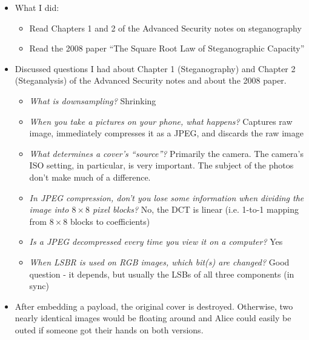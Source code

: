 \documentclass[11pt,a4paper]{report}
\begin{document}
\begin{itemize}

\item What I did:
  \begin{itemize}
  \item Read Chapters 1 and 2 of the Advanced Security notes on steganography
  \item Read the 2008 paper ``The Square Root Law of Steganographic Capacity''
  \end{itemize}

\item Discussed questions I had about Chapter 1 (Steganography) and Chapter 2 (Steganalysis) of the Advanced Security notes and about the 2008 paper.
  \begin{itemize}

  \item \textit{What is downsampling?} Shrinking

  \item \textit{When you take a pictures on your phone, what happens?} Captures raw image, immediately compresses it as a JPEG, and discards the raw image

  \item \textit{What determines a cover's ``source''?} Primarily the camera. The camera's ISO setting, in particular, is very important. The subject of the photos don't make much of a difference.

  \item \textit{In JPEG compression, don't you lose some information when dividing the image into $8\times8$ pixel blocks?} No, the DCT is linear (i.e. 1-to-1 mapping from $8\times8$ blocks to coefficients)

  \item \textit{Is a JPEG decompressed every time you view it on a computer?} Yes

  \item \textit{When LSBR is used on RGB images, which bit(s) are changed?} Good question - it depends, but usually the LSBs of all three components (in sync)

  \end{itemize}

\item After embedding a payload, the original cover is destroyed. Otherwise, two nearly identical images would be floating around and Alice could easily be outed if someone got their hands on both versions.

\end{itemize}
\end{document}
